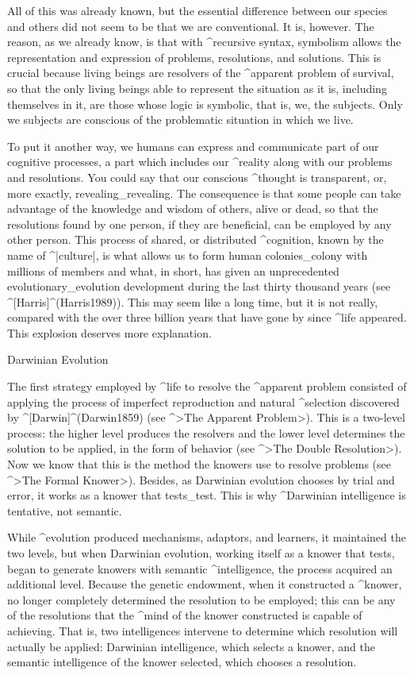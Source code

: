 All of this was already known, but the essential difference between our
species and others did not seem to be that we are conventional. It is,
however. The reason, as we already know, is that with ^{recursive
syntax}, symbolism allows the representation and expression of problems,
resolutions, and solutions. This is crucial because living beings are
resolvers of the ^{apparent problem} of survival, so that the only
living beings able to represent the situation as it is, including
themselves in it, are those whose logic is symbolic, that is, we, the
subjects. Only we subjects are conscious of the problematic situation in
which we live.

To put it another way, we humans can express and communicate part of our
cognitive processes, a part which includes our ^{reality} along with our
problems and resolutions. You could say that our conscious ^{thought} is
transparent, or, more exactly, revealing_{revealing}. The consequence is
that some people can take advantage of the knowledge and wisdom of
others, alive or dead, so that the resolutions found by one person, if
they are beneficial, can be employed by any other person. This process
of shared, or distributed ^{cognition}, known by the name of ^|culture|,
is what allows us to form human colonies_{colony} with millions of
members and what, in short, has given  an
unprecedented evolutionary_{evolution} development during the last
thirty thousand years (see ^[Harris]^(Harris1989)). This may seem like a
long time, but it is not really, compared with the over three billion
years that have gone by since ^{life} appeared. This explosion deserves
more explanation.


\Section Darwinian Evolution

The first strategy employed by ^{life} to resolve the ^{apparent
problem} consisted of applying the process of imperfect reproduction and
natural ^{selection} discovered by ^[Darwin]^(Darwin1859) (see ^>The
Apparent Problem>). This is a two-level process: the higher level
produces the resolvers and the lower level determines the solution to be
applied, in the form of behavior (see ^>The Double Resolution>). Now we
know that this is the method the knowers use to resolve problems (see
^>The Formal Knower>). Besides, as Darwinian evolution chooses by trial
and error, it works as a knower that tests_{test}. This is why
^{Darwinian intelligence} is tentative, not semantic.

While ^{evolution} produced mechanisms, adaptors, and learners, it
maintained the two levels, but when Darwinian evolution, working itself
as a knower that tests, began to generate knowers with semantic
^{intelligence}, the process acquired an additional level. Because the
genetic endowment, when it constructed a ^{knower}, no longer completely
determined the resolution to be employed; this can be any of the
resolutions that the ^{mind} of the knower constructed is capable of
achieving. That is, two intelligences intervene to determine which
resolution will actually be applied: Darwinian intelligence, which
selects a knower, and the semantic intelligence of the knower selected,
which chooses a resolution.

